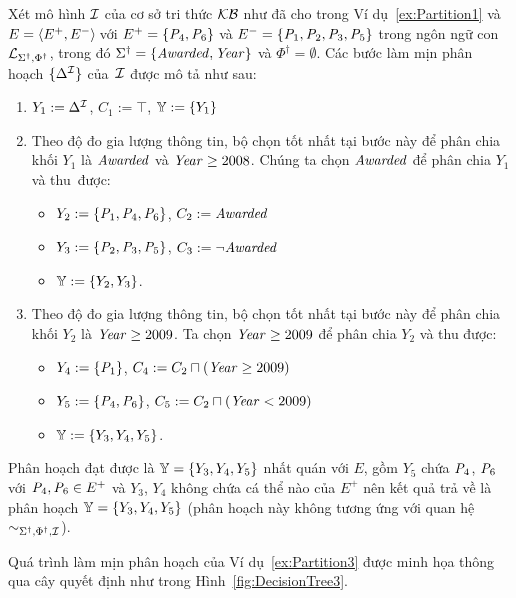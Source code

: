 \begin{Example}
\label{ex:Partition3}
Xét mô hình $\mathcal{I}$ của cơ sở tri thức $\mathcal{KB}$ như đã cho trong Ví dụ~\ref{ex:Partition1} và $E = \left\langle E^+, E^-\right\rangle\!$ với $E^+ = \{\mathit{P}_4, \mathit{P}_6\}$ và $E^- = \{\mathit{P}_1, \mathit{P}_2, \mathit{P}_3, \mathit{P}_5\}$ trong ngôn ngữ con $\mathcal{L}_{\Sigma^\dag,\Phi^\dag}$, trong đó $\Sigma^\dag = \{\mathit{Awarded},\mathit{Year}\}$ và $\Phi^\dag = \emptyset$. Các bước làm mịn phân hoạch $\{\Delta^{\mathcal{I}}\}$ của~$\mathcal{I}$ được mô tả như sau:
\begin{enumerate}
	\item $Y_1 := \Delta^{\mathcal{I}}$, $C_1 := \top$, $\mathbb{Y} := \{Y_1\}$
	\item Theo độ đo gia lượng thông tin, bộ chọn tốt nhất tại bước này để phân chia khối $Y_1$ là $\mathit{Awarded}$ và $\mathit{Year} \geq 2008$. Chúng ta chọn $\mathit{Awarded}$ để phân chia $Y_1$ và thu~được:
	\begin{itemize}
		\item $Y_2 := \{\mathit{P}_1, \mathit{P}_4, \mathit{P}_6\}$, $C_2 := \mathit{Awarded}$
		\item $Y_3 := \{\mathit{P}_2, \mathit{P}_3, \mathit{P}_5\}$, $C_3 := \neg\mathit{Awarded}$
		\item $\mathbb{Y} := \{Y_2, Y_3\}$.
	\end{itemize}
%
	\item Theo độ đo gia lượng thông tin, bộ chọn tốt nhất tại bước này để phân chia khối $Y_2$ là $\mathit{Year} \geq 2009$. Ta chọn $\mathit{Year} \geq 2009$ để phân chia $Y_2$ và thu được:
	\begin{itemize}
		\item $Y_4 := \{\mathit{P}_1\}$, $C_4 := C_2 \sqcap (\mathit{Year} \geq 2009)$
		\item $Y_5 := \{\mathit{P}_4, \mathit{P}_6\}$, $C_5 := C_2 \sqcap (\mathit{Year} < 2009)$
		\item $\mathbb{Y} := \{Y_3, Y_4, Y_5\}$.
	\end{itemize}
\end{enumerate}

\vspace{-1.0ex}
Phân hoạch đạt được là $\mathbb{Y} = \{Y_3, Y_4, Y_5\}$ nhất quán với $E$, gồm $Y_5$ chứa $\mathit{P}_4$, $\mathit{P}_6$ với $\mathit{P}_4, \mathit{P}_6 \in E^+$ và $Y_3$, $Y_4$ không chứa cá thể nào của $E^+$ nên kết quả trả về là phân hoạch $\mathbb{Y} = \{Y_3,Y_4,Y_5\}$
(phân hoạch này không tương ứng với quan hệ $\sim_{\Sigma^\dag,\Phi^\dag,\mathcal{I}}$).\myend
\end{Example}

\vspace{-1.0ex}
Quá trình làm mịn phân hoạch của Ví dụ~\ref{ex:Partition3} được minh họa thông qua cây quyết định như trong Hình~\ref{fig:DecisionTree3}.

